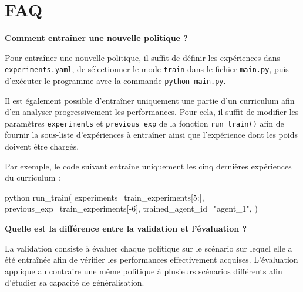 \section*{FAQ}

\noindent \textbf{Comment entraîner une nouvelle politique ?}

\vspace{10pt}

\noindent Pour entraîner une nouvelle politique, il suffit de définir les expériences dans \texttt{experiments.yaml}, de sélectionner le mode \texttt{train} dans le fichier \texttt{main.py}, puis d'exécuter le programme avec la commande \texttt{python main.py}.

\vspace{10pt}

\noindent Il est également possible d'entraîner uniquement une partie d'un curriculum afin d'en analyser progressivement les performances. Pour cela, il suffit de modifier les paramètres \texttt{experiments} et \texttt{previous\_exp} de la fonction \texttt{run\_train()} afin de fournir la sous-liste d'expériences à entraîner ainsi que l'expérience dont les poids doivent être chargés.

\vspace{10pt}

\noindent Par exemple, le code suivant entraîne uniquement les cinq dernières expériences du curriculum :

\begin{codebox}{python}
run_train(
    experiments=train_experiments[5:],
    previous_exp=train_experiments[-6],
    trained_agent_id="agent_1",
)
\end{codebox}

\vspace{10pt}

\noindent \textbf{Quelle est la différence entre la validation et l'évaluation ?}

\vspace{10pt}

\noindent La validation consiste à évaluer chaque politique sur le scénario sur lequel elle a été entraînée afin de vérifier les performances effectivement acquises. L'évaluation applique au contraire une même politique à plusieurs scénarios différents afin d'étudier sa capacité de généralisation.

